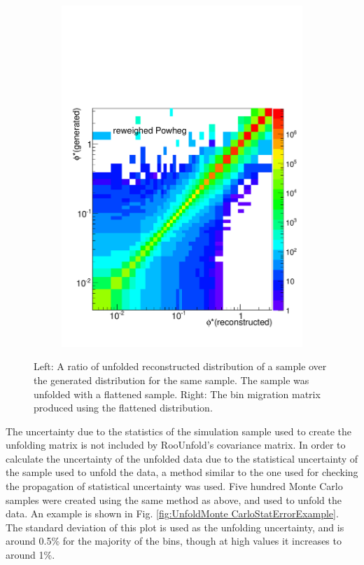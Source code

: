 \begin{figure}[!htbp]
\begin{subfigure}[b]{0.49\textwidth}
     \includegraphics[width=\linewidth]{figures/AnalysisSection/UnfoldWithFlatMatrix.pdf}
     \caption{}
    \end{subfigure}
    \caption{Left: A ratio of unfolded reconstructed \phistar distribution of a \MADGRAPH \Ztoee sample over the generated distribution for the same sample. The sample was unfolded with a flattened \Ztoee \POWHEG sample.  Right: The bin migration matrix produced using the flattened \POWHEG distribution.}
    \label{fig:BinMigrationWFlatPowheg}
\end{figure}

The uncertainty due to the statistics of the simulation sample used to create the unfolding matrix is not included by RooUnfold's covariance matrix. In order to calculate the uncertainty of the unfolded data due to the statistical uncertainty of the sample used to unfold the data, a method similar to the one used for checking the propagation of statistical uncertainty was used. Five hundred Monte Carlo samples were created using the same method as above, and used to unfold the data. An example is shown in Fig. \ref{fig:UnfoldMonte CarloStatErrorExample}. The standard deviation of this plot is used as the unfolding uncertainty, and is around 0.5\% for the majority of the bins, though at high \phistar values it increases to around 1\%. 

